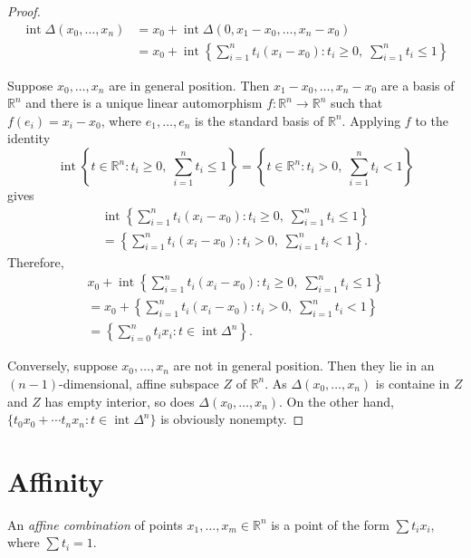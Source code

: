 \documentclass[12pt]{amsart}
\theoremstyle{definition}
\theoremstyle{remark}
\numberwithin{equation}{section}
\newcommand{\RR}{\mathbb{R}}
\DeclareMathOperator{\interior}{int}
\begin{document}
\begin{proof}
    \begin{align*}
        \interior \Delta(x_0,\ldots,x_n)
        &= x_0 + \interior \Delta(0, x_1-x_0,\ldots,x_n-x_0)\\
        &= x_0 + \interior \left\{\sum_{i=1}^nt_i(x_i-x_0) :
        t_i\geq 0,\; \sum_{i=1}^n t_i\leq 1\right\}
    \end{align*}

    Suppose $x_0,\ldots,x_n$ are in general position.
    Then $x_1-x_0,\ldots,x_n-x_0$ are a basis of $\RR^n$ and there
    is a unique linear automorphism $f:\RR^n\to\RR^n$
    such that $f(e_i)=x_i-x_0$, where $e_1,\ldots,e_n$ is the standard
    basis of $\RR^n$.
    Applying $f$ to the identity
    \[
        \interior\left\{t\in\RR^n :
        t_i\geq 0,\; \sum_{i=1}^n t_i\leq 1\right\}
        = \left\{t\in\RR^n : t_i > 0,\; \sum_{i=1}^n t_i< 1\right\}
    \]
    gives
    \begin{multline*}
        \interior \left\{\sum_{i=1}^nt_i(x_i-x_0) :
            t_i\geq 0,\; \sum_{i=1}^n t_i\leq 1\right\}
       \\ = \left\{\sum_{i=1}^nt_i(x_i-x_0) :
        t_i> 0,\; \sum_{i=1}^n t_i< 1\right\}.
    \end{multline*}
    Therefore,
    \begin{multline*}
        x_0 + \interior \left\{\sum_{i=1}^nt_i(x_i-x_0) :
        t_i\geq 0,\; \sum_{i=1}^n t_i\leq 1\right\}\\
        =x_0 + \left\{\sum_{i=1}^nt_i(x_i-x_0) :
        t_i> 0,\; \sum_{i=1}^n t_i< 1\right\}\\
        =\left\{\sum_{i=0}^nt_ix_i :
        t\in\interior\Delta^n\right\}.
    \end{multline*}

    Conversely, suppose $x_0,\ldots,x_n$ are not in general position.
    Then they lie in an $(n-1)$-dimensional, affine subspace $Z$
    of $\RR^n$.
    As $\Delta(x_0,\ldots,x_n)$ is containe in $Z$ and $Z$ has empty
    interior, so does $\Delta(x_0,\ldots,x_n)$.
    On the other hand, $\{t_0x_0+\cdots t_nx_n :
    t\in\interior\Delta^n\}$ is obviously nonempty.
\end{proof}

\section{Affinity}

An \emph{affine combination} of points $x_1,\ldots,x_m\in\RR^{n}$
is a point of the form $\sum t_ix_i$, where $\sum t_i=1$.
\end{document}
